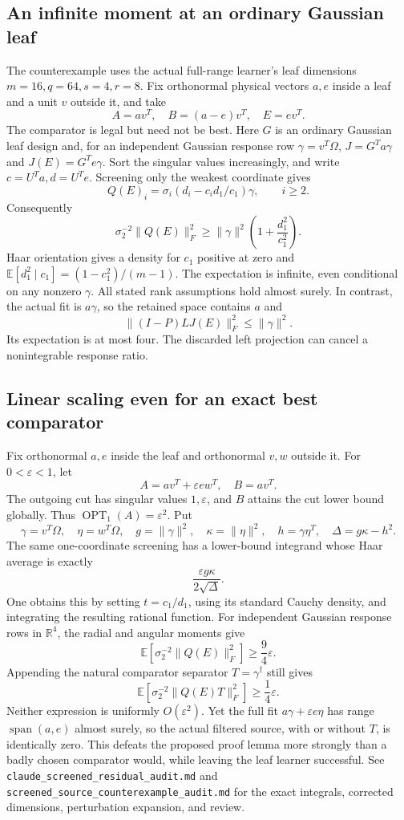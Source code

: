 \documentclass[11pt,oneside,openany,a4paper]{book}
\numberwithin{equation}{chapter}
\theoremstyle{definition}
\theoremstyle{remark}
\newcommand{\sourcefile}[1]{{\small\nolinkurl{#1}}}
\begin{document}
\subsection{An infinite moment at an ordinary Gaussian leaf}

The counterexample uses the actual full-range learner's leaf dimensions
$m=16,q=64,s=4,r=8$.  Fix orthonormal physical vectors $a,e$ inside a
leaf and a unit $v$ outside it, and take
\[
 A=av^T,\quad B=(a-e)v^T,\quad E=ev^T.
\]
The comparator is legal but need not be best.  Here $G$ is an ordinary
Gaussian leaf design and, for an independent Gaussian response row
$\gamma=v^T\Omega$,
$J=G^Ta\gamma$ and $J(E)=G^Te\gamma$.
Sort the singular values increasingly, and write
$c=U^Ta,d=U^Te$.  Screening only the weakest coordinate gives
\[
 Q(E)_i=\sigma_i(d_i-c_i d_1/c_1)\gamma,
 \qquad i\ge2.
\]
Consequently
\[
 \sigma_2^{-2}\|Q(E)\|_F^2
 \ge\|\gamma\|^2\left(1+\frac{d_1^2}{c_1^2}\right).
\]
Haar orientation gives a density for $c_1$ positive at zero and
$\mathbb E[d_1^2\mid c_1]=(1-c_1^2)/(m-1)$.  The expectation is
infinite, even conditional on any nonzero $\gamma$.  All stated rank
assumptions hold almost surely.  In contrast, the actual fit is
$a\gamma$, so the retained space contains $a$ and
\[
 \|(I-P)LJ(E)\|_F^2\le\|\gamma\|^2.
\]
Its expectation is at most four.  The discarded left projection can
cancel a nonintegrable response ratio.

\subsection{Linear scaling even for an exact best comparator}

Fix orthonormal $a,e$ inside the leaf and orthonormal $v,w$ outside it.
For $0<\varepsilon<1$, let
\[
 A=av^T+\varepsilon ew^T,\quad B=av^T.
\]
The outgoing cut has singular values $1,\varepsilon$, and $B$ attains
the cut lower bound globally.  Thus
$\operatorname{OPT}_1(A)=\varepsilon^2$.  Put
\[
 \gamma=v^T\Omega,\quad \eta=w^T\Omega,\quad
 g=\|\gamma\|^2,\quad \kappa=\|\eta\|^2,\quad
 h=\gamma\eta^T,\quad \Delta=g\kappa-h^2.
\]
The same one-coordinate screening has a lower-bound integrand whose
Haar average is exactly
\[
 \frac{\varepsilon g\kappa}{2\sqrt\Delta}.
\]
One obtains this by setting $t=c_1/d_1$, using its standard Cauchy
density, and integrating the resulting rational function.  For
independent Gaussian response rows in $\mathbb R^4$, the radial and
angular moments give
\[
 \mathbb E[\sigma_2^{-2}\|Q(E)\|_F^2]
 \ge\frac94\varepsilon.
\]
Appending the natural comparator separator $T=\gamma^\dagger$ still
gives
\[
 \mathbb E[\sigma_2^{-2}\|Q(E)T\|_F^2]
 \ge\frac14\varepsilon.
\]
Neither expression is uniformly $O(\varepsilon^2)$.  Yet the full fit
$a\gamma+\varepsilon e\eta$ has range $\operatorname{span}(a,e)$
almost surely, so the actual filtered source, with or without $T$, is
identically zero.  This defeats the proposed proof lemma more strongly
than a badly chosen comparator would, while leaving the leaf learner
successful.  See \sourcefile{claude_screened_residual_audit.md} and
\sourcefile{screened_source_counterexample_audit.md} for the exact
integrals, corrected dimensions, perturbation expansion, and review.
\end{document}
